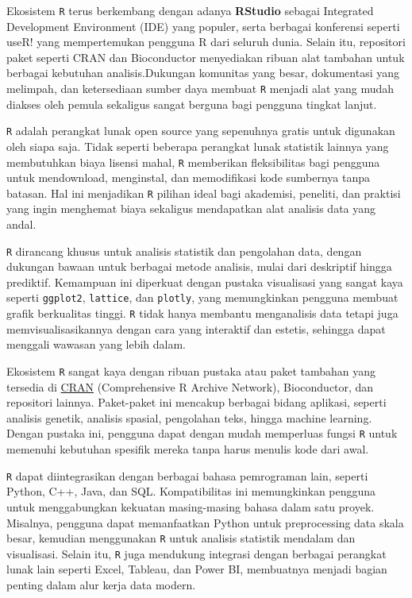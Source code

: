 \documentclass[
  oneside]{book}
\begin{document}
Ekosistem \texttt{R} terus berkembang dengan adanya \textbf{RStudio}
sebagai Integrated Development Environment (IDE) yang populer, serta
berbagai konferensi seperti useR! yang mempertemukan pengguna R dari
seluruh dunia. Selain itu, repositori paket seperti CRAN dan
Bioconductor menyediakan ribuan alat tambahan untuk berbagai kebutuhan
analisis.Dukungan komunitas yang besar, dokumentasi yang melimpah, dan
ketersediaan sumber daya membuat \texttt{R} menjadi alat yang mudah
diakses oleh pemula sekaligus sangat berguna bagi pengguna tingkat
lanjut.

\texttt{R} adalah perangkat lunak open source yang sepenuhnya
gratis untuk digunakan oleh siapa saja. Tidak seperti beberapa perangkat
lunak statistik lainnya yang membutuhkan biaya lisensi mahal,
\texttt{R} memberikan fleksibilitas bagi pengguna untuk
mendownload, menginstal, dan memodifikasi kode sumbernya tanpa batasan.
Hal ini menjadikan \texttt{R} pilihan ideal bagi akademisi,
peneliti, dan praktisi yang ingin menghemat biaya sekaligus mendapatkan
alat analisis data yang andal.

\texttt{R} dirancang khusus untuk analisis statistik dan pengolahan
data, dengan dukungan bawaan untuk berbagai metode analisis, mulai dari
deskriptif hingga prediktif. Kemampuan ini diperkuat dengan pustaka
visualisasi yang sangat kaya seperti \texttt{ggplot2}, \texttt{lattice}, dan \texttt{plotly},
yang memungkinkan pengguna membuat grafik berkualitas tinggi.
\texttt{R} tidak hanya membantu menganalisis data tetapi juga
memvisualisasikannya dengan cara yang interaktif dan estetis, sehingga
dapat menggali wawasan yang lebih dalam.

Ekosistem \texttt{R} sangat kaya dengan ribuan pustaka atau paket
tambahan yang tersedia di \href{https://cran.r-project.org/}{CRAN}
(Comprehensive R Archive Network), Bioconductor, dan repositori lainnya.
Paket-paket ini mencakup berbagai bidang aplikasi, seperti analisis
genetik, analisis spasial, pengolahan teks, hingga machine learning.
Dengan pustaka ini, pengguna dapat dengan mudah memperluas fungsi
\texttt{R} untuk memenuhi kebutuhan spesifik mereka tanpa harus
menulis kode dari awal.

\texttt{R} dapat diintegrasikan dengan berbagai bahasa pemrograman
lain, seperti Python, C++, Java, dan SQL. Kompatibilitas ini
memungkinkan pengguna untuk menggabungkan kekuatan masing-masing bahasa
dalam satu proyek. Misalnya, pengguna dapat memanfaatkan Python untuk
preprocessing data skala besar, kemudian menggunakan \texttt{R}
untuk analisis statistik mendalam dan visualisasi. Selain itu,
\texttt{R} juga mendukung integrasi dengan berbagai perangkat lunak
lain seperti Excel, Tableau, dan Power BI, membuatnya menjadi bagian
penting dalam alur kerja data modern.
\end{document}
